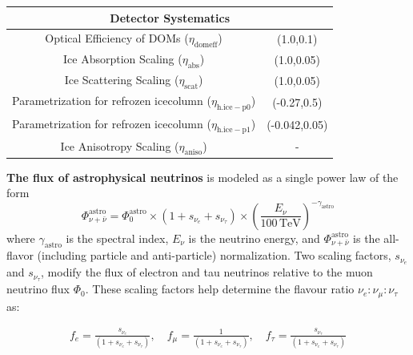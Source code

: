 \begin{table}[h]
\begin{tabular}{ |c |c|}
        \multicolumn{2}{c}{\textbf{Detector Systematics}}\\
        \hline
        Optical Efficiency of DOMs ($\eta_{\mathrm{domeff}}$) & (1.0,0.1)\\
        Ice Absorption Scaling ($\eta_{\mathrm{abs}}$)  & (1.0,0.05)\\
        Ice Scattering Scaling ($\eta_{\mathrm{scat}}$) & (1.0,0.05)\\
        Parametrization for refrozen icecolumn ($\eta_{\mathrm{h.ice-p0}}$)  & (-0.27,0.5)\\
        Parametrization for refrozen icecolumn ($\eta_{\mathrm{h.ice-p1}}$) & (-0.042,0.05)\\
        Ice Anisotropy Scaling ($\eta_{\mathrm{aniso}}$) &  -\\
        \hline
        \hline
    \end{tabular}
    
\end{table}

\newpage
\textbf{The flux of astrophysical neutrinos} is modeled as a single power law of the form
\begin{equation}\label{eq:SPL}
\Phi_{\nu + \bar{\nu}}^{\mathrm{astro}} = \Phi_{\mathrm{0}}^{\mathrm{astro}} \times 
    (1 + s_{\nu_{e}} + s_{\nu_{\tau}}) \times
    \left( \frac{E_\nu}{\mathrm{100\,TeV}} \right)^{-\gamma_{\mathrm{astro}}}
\end{equation}
where $\gamma_{\mathrm{astro}}$ is the spectral index, $E_\nu$ is the neutrino energy, and $\Phi_{\nu + \bar{\nu}}^{\mathrm{astro}}$ is the all-flavor (including particle and anti-particle) normalization. Two scaling factors, $s_{\nu_{e}}$ and $s_{\nu_{\tau}}$, modify the flux of electron and tau neutrinos relative to the muon neutrino flux $\Phi_{\mathrm{0}}$. These scaling factors help determine the flavour ratio $\nu_e:\nu_{\mu}:\nu_{\tau}$ as:

\begin{equation}\label{eq:flav_frac}
    \begin{array}{rcl}
        f_{e} = \frac{s_{\nu_{e}}}{(1 + s_{\nu_{e}} + s_{\nu_{\tau}})}, \quad
        f_{\mu} = \frac{1}{(1 + s_{\nu_{e}} + s_{\nu_{\tau}})}, \quad
        f_{\tau} = \frac{s_{\nu_{\tau}}}{(1 + s_{\nu_{e}} + s_{\nu_{\tau}})}
    \end{array}
\end{equation}

